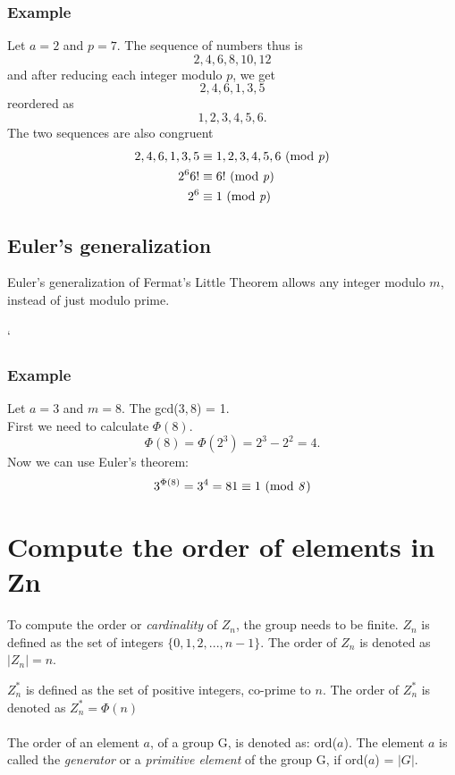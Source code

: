 \documentclass{article}
\begin{document}
 	\subsubsection*{Example}
 	Let $a = 2$ and $ p = 7$. The sequence of numbers thus is
 	$$
 	2,4,6,8,10,12
 	$$
 	and after reducing each integer modulo $p$, we get
 	$$
 	2,4,6,1,3,5
 	$$
 	reordered as
 	$$
 	1,2,3,4,5,6.
 	$$
 	The two sequences are also congruent 
 	\[
 	\begin{split}
	 	2,4,6,1,3,5 &\equiv 1,2,3,4,5,6 \text{ (mod \textit{p})}\\
	 	2^6 6! &\equiv 6! \text{ (mod \textit{p})} \\
	 	2^6 &\equiv 1 \text{ (mod \textit{p})}
 	\end{split}
 	\]
 	
 	\subsection*{Euler's generalization \cite{fermatsummary}}
 	Euler's generalization of Fermat's Little Theorem allows any integer modulo $m$, instead of just modulo prime.
 	\\
 	\\`
 	
 	\subsubsection*{Example}
 	Let $a = 3$ and $m = 8$. The gcd($3, 8$) = 1. 
 	\\
 	First we need to calculate $\Phi(8)$.
 	$$
 	\Phi(8) = \Phi(2^3) = 2^3-2^2 = 4.
 	$$
 	Now we can use Euler's theorem:
 	$$
 	3^{\Phi(8)} = 3^4 = 81 \equiv 1 \text{ (mod \textit{8})}
 	$$
 	
	\section*{Compute the order of elements in Zn \cite{groups}} 
	To compute the order or \textit{cardinality} of $Z_n$, the group needs to be finite. $Z_n$ is defined as the set of integers $\{0,1,2,...,n-1\}$. The order of $Z_n$ is denoted as $|Z_n| = n$.
	
	$Z_n^*$ is defined as the set of positive integers, co-prime to $n$. The order of $Z_n^*$ is denoted as $Z_n^* = \Phi(n)$
	\\
	\\
	The order of an element $a$, of a group G, is denoted as: ord($a$). The element $a$ is called the \textit{generator} or a \textit{primitive element} of the group G, if ord($a$) = $|G|$.
	
\end{document}
